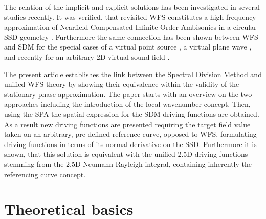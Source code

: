 \documentclass[journal]{IEEEtran}
\begin{document}
The relation of the implicit and explicit solutions has been investigated in several studies recently. 
It was verified, that revisited WFS constitutes a high frequency approximation of Nearfield Compensated Infinite Order Ambisonics in a circular SSD geometry \cite{Ahrens2012}. 
Furthermore the same connection has been shown between WFS and SDM for the special cases of a virtual point source \cite{Spors10ahrens:analysis}, a virtual plane wave \cite{Schultz2016,Schultz2016a}, and recently for an arbitrary 2D virtual sound field \cite{Firtha2016:UnifiedWFS}.

The present article establishes the link between the Spectral Division Method and unified WFS theory by showing their equivalence within the validity of the stationary phase approximation.
The paper starts with an overview on the two approaches including the introduction of the local wavenumber concept.
Then, using the SPA the spatial expression for the SDM driving functions are obtained.
As a result new driving functions are presented requiring the target field value taken on an arbitrary, pre-defined reference curve, opposed to WFS, formulating driving functions in terms of its normal derivative on the SSD.
Furthermore it is shown, that this solution is equivalent with the unified 2.5D driving functions stemming from the 2.5D Neumann Rayleigh integral, containing inherently the referencing curve concept.

\section{Theoretical basics}
%
\end{document}
